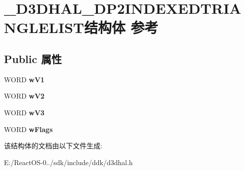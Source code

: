\hypertarget{struct___d3_d_h_a_l___d_p2_i_n_d_e_x_e_d_t_r_i_a_n_g_l_e_l_i_s_t}{}\section{\+\_\+\+D3\+D\+H\+A\+L\+\_\+\+D\+P2\+I\+N\+D\+E\+X\+E\+D\+T\+R\+I\+A\+N\+G\+L\+E\+L\+I\+S\+T结构体 参考}
\label{struct___d3_d_h_a_l___d_p2_i_n_d_e_x_e_d_t_r_i_a_n_g_l_e_l_i_s_t}
\subsection*{Public 属性}
\begin{DoxyCompactItemize}
\item 
\mbox{\label{struct___d3_d_h_a_l___d_p2_i_n_d_e_x_e_d_t_r_i_a_n_g_l_e_l_i_s_t_a335cce7a21dc92952ba9e8d525453da8}} 
W\+O\+RD {\bfseries w\+V1}
\item 
\mbox{\label{struct___d3_d_h_a_l___d_p2_i_n_d_e_x_e_d_t_r_i_a_n_g_l_e_l_i_s_t_a94ba4a06c0b19bae5f7873e597979c25}} 
W\+O\+RD {\bfseries w\+V2}
\item 
\mbox{\label{struct___d3_d_h_a_l___d_p2_i_n_d_e_x_e_d_t_r_i_a_n_g_l_e_l_i_s_t_a0faeabc21763ebb0a7f57e9f06e142f5}} 
W\+O\+RD {\bfseries w\+V3}
\item 
\mbox{\label{struct___d3_d_h_a_l___d_p2_i_n_d_e_x_e_d_t_r_i_a_n_g_l_e_l_i_s_t_aa26ff8f5efd70bb7f5507183ba145bef}} 
W\+O\+RD {\bfseries w\+Flags}
\end{DoxyCompactItemize}


该结构体的文档由以下文件生成\+:\begin{DoxyCompactItemize}
\item 
E\+:/\+React\+O\+S-\/0../sdk/include/ddk/d3dhal.\+h\end{DoxyCompactItemize}
